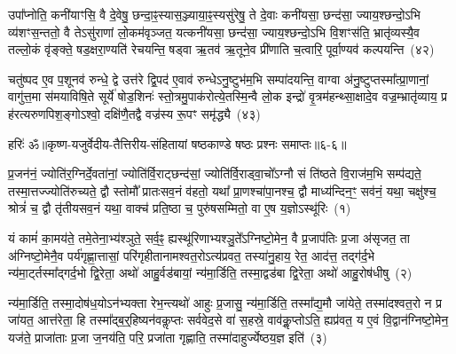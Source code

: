 उपा᳚प्नोति॒ कनी॑याꣳसि॒ वै दे॒वेषु॒ छन्दा॒ꣴ॒स्यास॒ञ्ज्याया॒ꣴ॒स्यसु॑रेषु॒ ते दे॒वाः कनी॑यसा॒ छन्द॑सा॒ ज्याय॒श्छन्दो॒\-ऽभि व्य॑शꣳस॒न्ततो॒ वै ते\-ऽसु॑राणां लो॒कम॑वृञ्जत॒ यत्कनी॑यसा॒ छन्द॑सा॒ ज्याय॒श्छन्दो॒\-ऽभि वि॒शꣳस॑ति॒ भ्रातृ॑व्यस्यै॒व तल्लो॒कं वृ॑ङ्क्ते॒ षड॒क्षरा॒ण्यति॑ रेचयन्ति॒ षड्वा ऋ॒तव॑ ऋ॒तूने॒व प्री॑णाति च॒त्वारि॒ पूर्वा॒ण्यव॑ कल्पयन्ति~(४२)

चतु॑ष्पद ए॒व प॒शूनव॑ रुन्धे॒ द्वे उत्त॑रे द्वि॒पद॑ ए॒वाव॑ रुन्धे\-ऽनु॒ष्टुभ॑म॒भि सम्पा॑दयन्ति॒ वाग्वा अ॑नु॒ष्टुप्तस्मा᳚त्प्रा॒णानां॒ वागु॑त्त॒मा स॑मयाविषि॒ते सूर्ये॑ षोड॒शिनः॑ स्तो॒त्रमु॒पाक॑रोत्ये॒तस्मि॒न्वै लो॒क इन्द्रो॑ वृ॒त्रम॑हन्थ्सा॒क्षादे॒व वज्र॒म्भ्रातृ॑व्याय॒ प्र ह॑रत्यरुणपिश॒ङ्गो\-ऽश्वो॒ दक्षि॑णै॒तद्वै वज्र॑स्य रू॒पꣳ समृ॑द्ध्यै~(४३)


{}%

{हरिः॑ ॐ}{॥कृष्ण-यजुर्वेदीय-तैत्तिरीय-संहितायां षष्ठकाण्डे षष्ठः प्रश्नः समाप्तः॥६-६॥}


\setcounter{anuvakam}{0}
प्र॒जन॑नं॒ ज्योति॑र॒ग्निर्दे॒वता॑नां॒ ज्योति॑र्वि॒राट्छन्द॑सां॒ ज्योति॑र्वि॒राड्वा॒चो᳚\-ऽग्नौ सं ति॑ष्ठते वि॒राज॑म॒भि सम्प॑द्यते॒ तस्मा॒\-त्तज्ज्योति॑रुच्यते॒ द्वौ स्तोमौ᳚ प्रातःसव॒नं व॑हतो॒ यथा᳚ प्रा॒णश्चा॑पा॒नश्च॒ द्वौ माध्य॑न्दिन॒ꣳ॒ सव॑नं॒ यथा॒ चक्षु॑श्च॒ श्रोत्रं॑ च॒ द्वौ तृ॑तीयसव॒नं यथा॒ वाक्च॑ प्रति॒ष्ठा च॒ पुरु॑षसम्मितो॒ वा ए॒ष य॒ज्ञो\-ऽस्थू॑रिः~(१)

यं कामं॑ का॒मय॑ते॒ तमे॒तेना॒भ्य॑श्ञुते॒ सर्व॒ꣴ॒ ह्यस्थू॑रिणाभ्यश्ञु॒ते᳚\-ऽग्निष्टो॒मेन॒ वै प्र॒जा\-प॑तिः प्र॒जा अ॑सृजत॒ ता अ॑ग्निष्टो॒मेनै॒व पर्य॑गृह्णा॒त्तासां॒ परि॑गृहीतानामश्वत॒रो\-ऽत्य॑प्रवत॒ तस्या॑नु॒हाय॒ रेत॒ आद॑त्त॒ तद्ग॑र्द॒भे न्य॑मा॒र्ट्तस्मा᳚द्गर्द॒भो द्वि॒रेता॒ अथो॑ आहु॒र्वड॑बायां॒ न्य॑मा॒र्डिति॒ तस्मा॒द्वड॑बा द्वि॒रेता॒ अथो॑ आहु॒रोष॑धीषु~(२)

न्य॑मा॒र्डिति॒ तस्मा॒दोष॑ध॒यो\-ऽन॑भ्यक्ता रेभ॒न्त्यथो॑ आहुः प्र॒जासु॒ न्य॑मा॒र्डिति॒ तस्मा᳚द्य॒मौ जा॑येते॒ तस्मा॑दश्वत॒रो न प्र जा॑यत॒ आत्त॑रेता॒ हि तस्मा᳚द्ब॒र्॒\mbox{}हिष्यन॑वकॢप्तः सर्ववेद॒से वा॑ स॒हस्रे॒ वाव॑कॢ॒प्तो\-ऽति॒ ह्यप्र॑वत॒ य ए॒वं वि॒द्वान॑ग्निष्टो॒मेन॒ यज॑ते॒ प्राजा॑ताः प्र॒जा ज॒नय॑ति॒ परि॒ प्रजा॑ता गृह्णाति॒ तस्मा॑दाहुर्ज्येष्ठय॒ज्ञ इति॑~(३)

